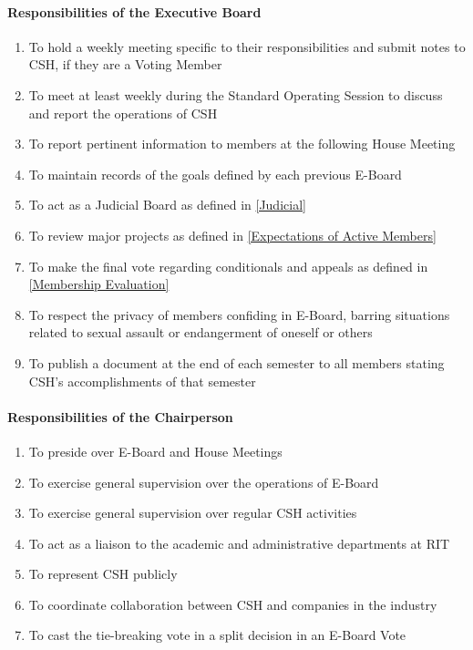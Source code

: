 \documentclass{article}
\newcommand{\asubsubsection}[1]{\paragraph{#1} \label{#1}}
\begin{document}
\asubsubsection{Responsibilities of the Executive Board}
\renewcommand{\theenumi}{\arabic{enumi}} %
\begin{enumerate}
	\item To hold a weekly meeting specific to their responsibilities and submit notes to CSH, if they are a Voting Member
	\item To meet at least weekly during the Standard Operating Session to discuss and report the operations of CSH
	\item To report pertinent information to members at the following House Meeting
	\item To maintain records of the goals defined by each previous E-Board
	\item To act as a Judicial Board as defined in \ref{Judicial}
	\item To review major projects as defined in \ref{Expectations of Active Members}
	\item To make the final vote regarding conditionals and appeals as defined in \ref{Membership Evaluation}
	\item To respect the privacy of members confiding in E-Board, barring situations related to sexual assault or endangerment of oneself or others
	\item To publish a document at the end of each semester to all members stating CSH's accomplishments of that semester
\end{enumerate}

\asubsubsection{Responsibilities of the Chairperson}
\begin{enumerate}
	\item To preside over E-Board and House Meetings
	\item To exercise general supervision over the operations of E-Board
	\item To exercise general supervision over regular CSH activities
	\item To act as a liaison to the academic and administrative departments at RIT
	\item To represent CSH publicly
	\item To coordinate collaboration between CSH and companies in the industry
	\item To cast the tie-breaking vote in a split decision in an E-Board Vote
\end{enumerate}
\end{document}
